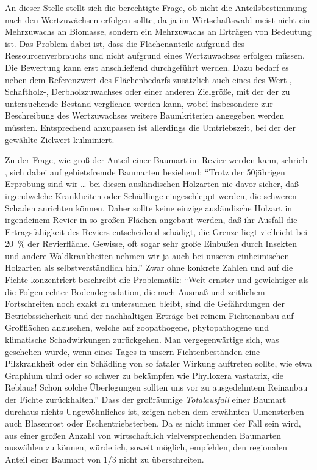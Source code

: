 \documentclass[twocolumn, paper=a4, fontsize=10pt, bibliography=totoc, index=totoc]{scrartcl}
\begin{document}
An dieser Stelle stellt sich die berechtigte Frage, ob nicht die
Anteilsbestimmung nach den Wertzuwächsen erfolgen sollte, da ja im
Wirtschaftswald meist nicht ein Mehrzuwachs an Biomasse, sondern ein Mehrzuwachs
an Erträgen von Bedeutung ist. Das Problem dabei ist, dass die Flächenanteile
aufgrund des Ressourcenverbrauchs und nicht aufgrund eines Wertzuwachses
erfolgen müssen. Die Bewertung kann erst anschließend durchgeführt werden. Dazu
bedarf es neben dem Referenzwert des Flächenbedarfs zusätzlich auch eines des
Wert-, Schaftholz-, Derbholzzuwachses oder einer anderen Zielgröße, mit der
der zu untersuchende Bestand verglichen werden kann, wobei insbesondere zur
Beschreibung des Wertzuwachses weitere Baumkriterien angegeben werden müssten.
Entsprechend anzupassen ist allerdings die Umtriebszeit, bei der der gewählte
Zielwert kulminiert.

Zu der Frage, wie groß der Anteil einer Baumart im Revier werden kann,
schrieb \citet[S.~233]{wiedemann1951Ertragskunde}, sich dabei auf
gebietsfremde Baumarten beziehend: \enquote{Trotz der 50jährigen
Erprobung sind wir \dots{} bei diesen ausländischen Holzarten nie davor
sicher, daß irgendwelche Krankheiten oder Schädlinge eingeschleppt
werden, die schweren Schaden anrichten können. Daher sollte keine
einzige ausländische Holzart in irgendeinem Revier in so großen
Flächen angebaut werden, daß ihr Ausfall die Ertragsfähigkeit des
Reviers entscheidend schädigt, die Grenze liegt vielleicht bei
\qty{20}{\percent} der Revierfläche. Gewisse, oft sogar sehr große Einbußen
durch Insekten und andere Waldkrankheiten nehmen wir ja auch bei
unseren einheimischen Holzarten als selbstverständlich hin.}
Zwar ohne konkrete Zahlen und auf die Fichte konzentriert beschreibt
\citet[S.~394]{assmann1961Waldertraskunde} die Problematik: \enquote{Weit
ernster und gewichtiger als die Folgen echter Bodendegradation, die
nach Ausmaß und zeitlichem Fortschreiten noch exakt zu untersuchen
bleibt, sind die Gefährdungen der Betriebssicherheit und der
nachhaltigen Erträge bei reinem Fichtenanbau auf Großflächen
anzusehen, welche auf zoopathogene, phytopathogene und klimatische
Schadwirkungen zurückgehen. Man vergegenwärtige sich, was geschehen
würde, wenn eines Tages in unsern Fichtenbeständen eine Pilzkrankheit
oder ein Schädling von so fataler Wirkung auftreten sollte, wie etwa
Graphium ulmi oder so schwer zu bekämpfen wie Phylloxera vastatrix,
die Reblaus! Schon solche Überlegungen sollten uns vor zu ausgedehntem
Reinanbau der Fichte zurückhalten.} Dass der großräumige
\emph{Totalausfall} einer Baumart durchaus nichts Ungewöhnliches ist,
zeigen neben dem erwähnten Ulmensterben auch Blasenrost oder
Eschentriebsterben. Da es nicht immer der Fall sein wird, aus einer
großen Anzahl von wirtschaftlich vielversprechenden Baumarten
auswählen zu können, würde ich, soweit möglich, empfehlen, den
regionalen Anteil einer Baumart von 1/3 nicht zu überschreiten.
\end{document}
